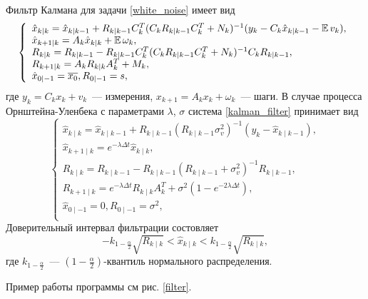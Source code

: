 Фильтр Калмана для задачи \eqref{white_noise} имеет вид
\begin{equation} \label{kalman_filter}
    \left\{
    \begin{array}{lcr}
        \hat x_{k\mid k} = \hat x_{k\mid k-1} + R_{k \mid k-1} 
			C_k^T (C_k R_{k\mid k-1} C_k^T + N_k)^{-1} 
			(y_k - C_k \hat x_{k\mid k-1} - \operatorname{\mathbb{E}} v_k),        	 			\\
		\hat x_{k+1\mid k} = A_k \hat x_{k\mid k} + \operatorname{\mathbb{E}} \omega_k, 			\\
		R_{k\mid k} = R_{k\mid k-1} - R_{k\mid k-1} 
			C_k^T (C_k R_{k\mid k-1} C_k^T + N_k)^{-1} C_k R_{k\mid k-1},	\\
		R_{k+1 \mid k} = A_k R_{k\mid k} A_k^T + M_k,						\\
		\hat x_{0\mid -1} = \overline{x_0}, R_{0\mid -1} = s,				\\
    \end{array}
    \right.
\end{equation}
где  $y_k = C_k x_k + v_k$~--- измерения, 
$x_{k+1} = A_k x_k + \omega_k$~--- шаги. В случае процесса Орнштейна-Уленбека с 
параметрами $\lambda$, $\sigma$ система \eqref{kalman_filter} принимает вид
\begin{equation}
    \left\{
    \begin{array}{lcr}
        \hat x_{k\mid k} = \hat x_{k\mid k-1} + R_{k \mid k-1} 
			(R_{k\mid k-1} \sigma_v^2)^{-1} 
			(y_k - \hat x_{k\mid k-1}),										\\
		\hat x_{k+1\mid k} = e^{-\lambda\Delta t} \hat x_{k\mid k}, 		\\
		R_{k\mid k} = R_{k\mid k-1} - R_{k\mid k-1} 
			(R_{k\mid k-1} + \sigma_v^2)^{-1} R_{k\mid k-1},				\\
		R_{k+1 \mid k} = e^{-\lambda \Delta t} R_{k\mid k} A_k^T + 
		\sigma^2 (1-e^{-2\lambda \Delta t}),								\\
		\hat x_{0\mid -1} = 0, R_{0\mid -1} = \sigma^2,						\\
    \end{array}
    \right.
\end{equation}
Доверительный интервал фильтрации состовляет
\begin{equation}
	- k_{1-\frac{\alpha}{2}}\sqrt{R_{k\mid k}} < \hat x_{k\mid k} < 
	k_{1-\frac{\alpha}{2}}\sqrt{R_{k\mid k}},
\end{equation}
где $k_{1-\frac{\alpha}{2}}$~--- $(1-\frac{\alpha}{2})$-квантиль нормального 
распределения.

Пример работы программы см рис. \ref{filter}.

